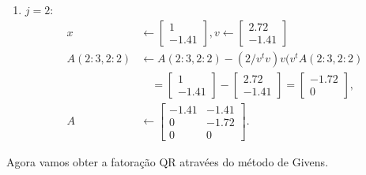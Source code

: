 \documentclass[a4paper,12pt, leqno, answers]{exam}
\begin{document}
\begin{questions}
\begin{parts}
\begin{solution}
\begin{enumerate}
                \item $j = 2$:
                    \begin{align*}
                        x &\leftarrow \begin{bmatrix}
                            1 \\
                            -1.41
                        \end{bmatrix}, v \leftarrow \begin{bmatrix}
                            2.72 \\
                            -1.41
                        \end{bmatrix} \\
                        A(2:3, 2:2) &\leftarrow A(2:3, 2:2) - (2 / v^t v) v (v^t A(2:3, 2:2) \\
                        &\quad = \begin{bmatrix}
                            1 \\
                            -1.41
                        \end{bmatrix} - \begin{bmatrix}
                            2.72 \\
                            -1.41
                        \end{bmatrix} = \begin{bmatrix}
                            -1.72 \\
                            0
                        \end{bmatrix}, \\
                        A &\leftarrow \begin{bmatrix}
                            -1.41 & -1.41 \\
                            0 & -1.72 \\
                            0 & 0
                        \end{bmatrix}.
                    \end{align*}
            \end{enumerate}

            Agora vamos obter a fatora\c{c}\~{a}o QR atrav\'{e}es do m\'{e}todo de Givens.


\end{solution}
\end{parts}
\end{questions}
\end{document}
